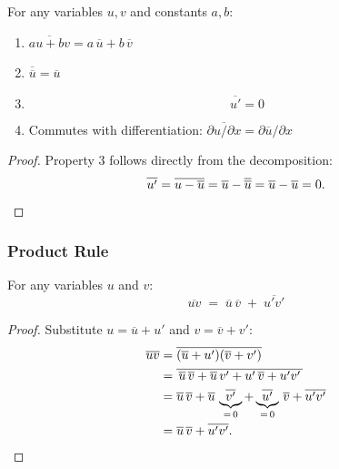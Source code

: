 \begin{proposition}\label{prop:reynolds-props}

  For any variables $u, v$ and constants $a, b$:
  \begin{enumerate}
    \item {} $\overline{au + bv} = a\,\overline{u} + b\,\overline{v}$
    \item {} $\overline{\overline{u}} = \overline{u}$
    \item {}
    \begin{equation}\label{eq:mean-pert-zero}
      \overline{u'} = 0
    \end{equation}
    \item Commutes with differentiation: $\overline{\partial u / \partial x} = \partial \overline{u}/\partial x$
  \end{enumerate}
\end{proposition}

\begin{proof}
  Property 3 follows directly from the decomposition:
  \[
    \overline{u'} = \overline{u - \overline{u}}
    = \overline{u} - \overline{\overline{u}}
    = \overline{u} - \overline{u} = 0. \qedhere
  \]
\end{proof}

\subsubsection{Product Rule}

\begin{proposition}\label{prop:reynolds-product}

  For any variables $u$ and $v$:
  \begin{equation}\label{eq:reynolds-product}
    \overline{uv} \;=\; \overline{u}\,\overline{v} \;+\; \overline{u'v'}
  \end{equation}
\end{proposition}

\begin{proof}
  Substitute $u = \overline{u} + u'$ and $v = \overline{v} + v'$:
  \begin{align*}
    \overline{uv}
    &= \overline{(\overline{u} + u')(\overline{v} + v')} \\
    &= \overline{\,\overline{u}\,\overline{v}
       + \overline{u}\,v'
       + u'\,\overline{v}
       + u'v'\,} \\
    &= \overline{u}\,\overline{v}
       + \overline{u}\,\underbrace{\overline{v'}}_{=\,0}
       + \underbrace{\overline{u'}}_{=\,0}\,\overline{v}
       + \overline{u'v'} \\
    &= \overline{u}\,\overline{v} + \overline{u'v'}. \qedhere
  \end{align*}
\end{proof}

